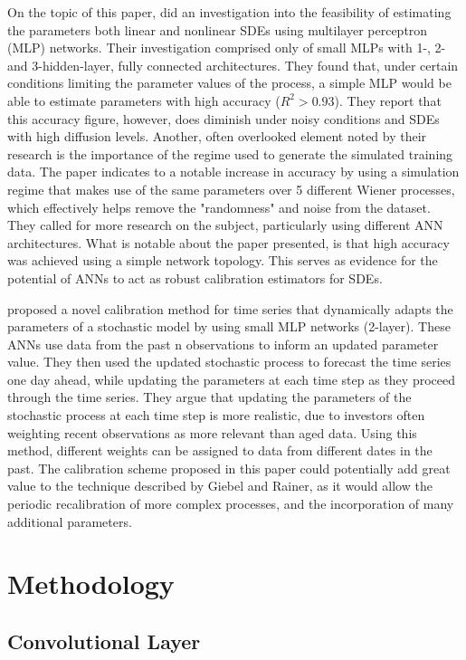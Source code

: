 \documentclass[11pt,oneside,openany,a4paper,english, report, goldenblock
]{usthesis}
\begin{document}
On the topic of this paper, \citet{Xie} did an investigation into the feasibility of estimating the parameters both linear and nonlinear SDEs using multilayer perceptron (MLP) networks. Their investigation comprised only of small MLPs with 1-, 2- and 3-hidden-layer, fully connected architectures. They found that, under certain conditions limiting the parameter values of the process, a simple MLP would be able to estimate parameters with high accuracy ($R^2 > 0.93$). They report that this accuracy figure, however, does diminish under noisy conditions and SDEs with high diffusion levels. Another, often overlooked element noted by their research is the importance of the regime used to generate the simulated training data. The paper indicates to a notable increase in accuracy by using a simulation regime that makes use of the same parameters over 5 different Wiener processes, which effectively helps remove the "randomness" and noise from the dataset. They called for more research on the subject, particularly using different ANN architectures. What is notable about the paper presented, is that high accuracy was achieved using a simple network topology. This serves as evidence for the potential of ANNs to act as robust calibration estimators for SDEs.


\citet{Giebel} proposed a novel calibration method for time series that dynamically adapts the parameters of a stochastic model by using small MLP networks (2-layer). These ANNs use data from the past n observations to inform an updated parameter value. They then used the updated stochastic process to forecast the time series one day ahead, while updating the parameters at each time step as they proceed through the time series. They argue that updating the parameters of the stochastic process at each time step is more realistic, due to investors often weighting recent observations as more relevant than aged data. Using this method, different weights can be assigned to data from different dates in the past. The calibration scheme proposed in this paper could potentially add great value to the technique described by Giebel and Rainer, as it would allow the periodic recalibration of more complex processes, and the incorporation of many additional parameters. 

\chapter{Methodology}

\section{Convolutional Layer}
\end{document}
